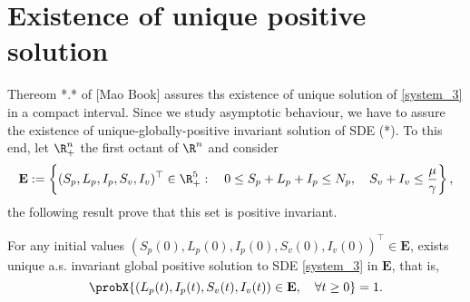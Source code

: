 \section{Existence of unique positive solution}
Thereom *.* of [Mao Book] assures ths existence of unique solution of 
\eqref{system_3} in a compact interval. Since we study asymptotic behaviour, 
we have to assure the existence of unique-globally-positive invariant solution 
of SDE (*). To this end, let $\R^n_+$ the first octant of $\R ^ n$ and 
consider  
$$	{
	\mathbf{E}:= 
		\left \{ 
			(S_p, L_p, I_p, S_v, I_v)^{\top} \in \R^5_+: \quad
			0\leq S_p + L_p + I_p \leq N_p, \quad
			S_v + I_v \leq \frac{\mu}{\gamma}
		\right \},
	}
$$
the following result prove that this set is positive invariant.
%
\begin{theorem}\label{existence-unique}
	For any initial values 
	$
		(S_p(0), L_p(0), I_p(0), S_v(0), I_v(0))^{\top}
		\in \mathbf{E}
	$, 
	exists unique a.s. invariant global positive solution to SDE 
	\eqref{system_3} in $\mathbf{E}$, that is,
	\begin{equation*}
		\probX{
			(L_p(t), I_p(t), S_v(t), I_v(t)) 
			\in 
			\mathbf{E}, \quad
			\forall t \geq 0
		} = 1.
	\end{equation*}
\end{theorem}
%
